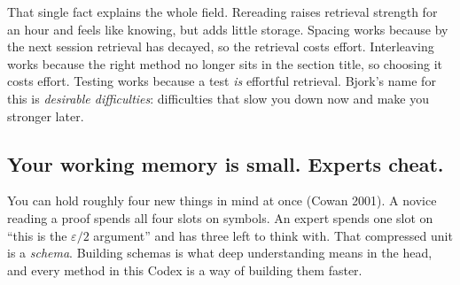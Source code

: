\documentclass{kaelearn}
\begin{document}
That single fact explains the whole field. Rereading raises retrieval strength for an hour and
feels like knowing, but adds little storage. Spacing works because by the next session retrieval
has decayed, so the retrieval costs effort. Interleaving works because the right method no longer
sits in the section title, so choosing it costs effort. Testing works because a test \emph{is}
effortful retrieval. Bjork's name for this is \emph{desirable difficulties}: difficulties that
slow you down now and make you stronger later.

\begin{center}
\end{center}

\subsection{Your working memory is small. Experts cheat.}
You can hold roughly four new things in mind at once (Cowan 2001). A novice reading a proof spends all four
slots on symbols. An expert spends one slot on ``this is the $\varepsilon/2$ argument'' and has
three left to think with. That compressed unit is a \emph{schema}. Building schemas is what deep
understanding means in the head, and every method in this Codex is a way of building them faster.
\end{document}
